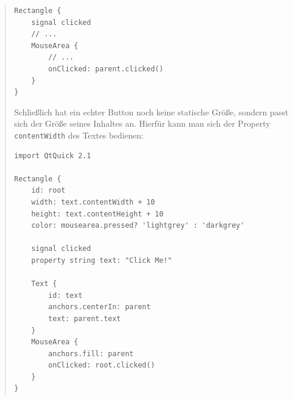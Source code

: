\documentclass[a4paper]{article}
\begin{document}
\begin{quote}
\begin{verbatim}
Rectangle {
    signal clicked
    // ...
    MouseArea {
        // ...
        onClicked: parent.clicked()
    }
}
\end{verbatim}

Schließlich hat ein echter Button noch keine statische Größe, sondern passt sich der Größe seines Inhaltes an. Hierfür kann man sich der Property \verb~contentWidth~ des Textes bedienen:

\begin{verbatim}
import QtQuick 2.1

Rectangle {
    id: root
    width: text.contentWidth + 10
    height: text.contentHeight + 10
    color: mousearea.pressed? 'lightgrey' : 'darkgrey'

    signal clicked
    property string text: "Click Me!"

    Text {
        id: text
        anchors.centerIn: parent
        text: parent.text
    }
    MouseArea {
        anchors.fill: parent
        onClicked: root.clicked()
    }
}
\end{verbatim}
\end{quote}
\end{document}
